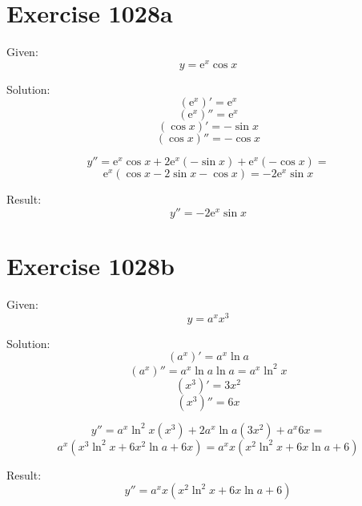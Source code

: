 \documentclass[a4paper, 10pt]{scrartcl}
\newcommand*\euler{\mathrm{e}}
\begin{document}
\section{Exercise 1028a}

Given:
\[
y = \euler^{x}\cos{x}
\]

Solution:
\[
(\euler^{x})' = \euler^{x}
\]
\[
(\euler^{x})'' = \euler^{x}
\]
\[
(\cos{x})' = -\sin{x}
\]
\[
(\cos{x})'' = -\cos{x}
\]

\[
y'' = \euler^{x}\cos{x} + 2\euler^{x}(-\sin{x}) + \euler^{x}(-\cos{x}) =
\]
\[
\euler^{x}(\cos{x} - 2\sin{x} - \cos{x}) = -2\euler^{x}\sin{x}
\]

Result:
\[
y'' = -2\euler^{x}\sin{x}
\]

\section{Exercise 1028b}

Given:
\[
y = a^{x}x^{3}
\]

Solution:
\[
(a^{x})' = a^{x}\ln{a}
\]
\[
(a^{x})'' = a^{x}\ln{a}\ln{a} = a^{x}\ln^{2}{x}
\]
\[
(x^{3})' = 3x^{2}
\]
\[
(x^{3})'' = 6x
\]

\[
y'' = a^{x}\ln^{2}{x}(x^{3}) + 2a^{x}\ln{a}(3x^{2}) + a^{x}6x =
\]
\[
a^{x}(x^{3}\ln^{2}{x} + 6x^{2}\ln{a} + 6x) = a^{x}x(x^{2}\ln^{2}{x} + 6x\ln{a} + 6)
\]

Result:
\[
y'' = a^{x}x(x^{2}\ln^{2}{x} + 6x\ln{a} + 6)
\]
\end{document}
